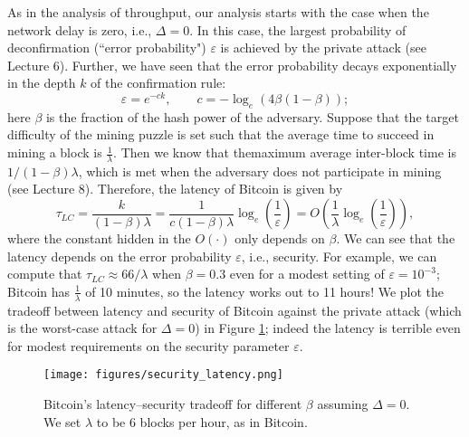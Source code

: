 \documentclass{article}
\begin{document}
As in the analysis of throughput, our analysis starts with the case when the network delay is zero, i.e.,  $\Delta = 0$. In this case,  the largest  probability of deconfirmation (``error probability") $\varepsilon$ is achieved by the private attack (see Lecture 6). Further, we have seen that the error probability decays exponentially in the  depth $k$ of the  confirmation rule: 
$$ \varepsilon = e^{-ck}, \quad \quad c = -\log_e(4\beta(1-\beta)); 
$$ 
here $\beta$ is the fraction of the hash power of the adversary. Suppose that the target difficulty of the mining puzzle is set such that the average time to succeed in mining a block is $\frac{1}{\lambda}$. Then we know that themaximum average inter-block time  is $1/(1-\beta)\lambda$, which is met when the adversary does not participate in mining (see Lecture 8). Therefore, the latency of {\sf Bitcoin} is given by
\begin{equation*}
    \tau_{LC} = \frac{k}{(1-\beta)\lambda} = \frac{1}{c(1-\beta)\lambda}\log_e(\frac{1}{\varepsilon}) = O(\frac{1}{\lambda} \log_e(\frac{1}{\varepsilon})), 
\end{equation*}
where the constant hidden in the $O(\cdot)$ only depends on $\beta$. We can see that the latency depends on the error probability $\varepsilon$, i.e., security. For example, we can compute that $\tau_{LC} \approx 66/\lambda$ when $\beta = 0.3$ even for a modest setting of $\varepsilon = 10^{-3}$; {\sf Bitcoin} has $\frac{1}{\lambda}$ of 10 minutes, so the latency works out to  11 hours! We plot the tradeoff between latency and security of {\sf Bitcoin} against the private attack (which is the worst-case attack   for  $\Delta = 0$) in Figure \ref{fig:tradeoff}; indeed the latency is terrible even for modest requirements on the security parameter $\varepsilon$. 

\begin{figure}
\begin{center}
\texttt{[image: figures/security\_latency.png]}
\end{center}

\caption{Bitcoin’s latency–security tradeoff for different $\beta$ assuming $\Delta = 0$. We set $\lambda$ to be 6 blocks per hour, as in Bitcoin.}
\label{fig:tradeoff}

\end{figure}
\end{document}

